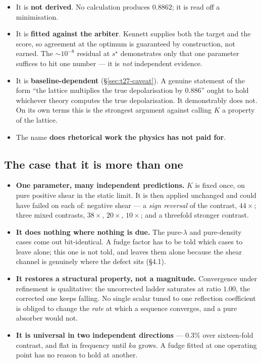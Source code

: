 \documentclass[11pt,a4paper]{article}
\newcommand{\Kren}{K}
\begin{document}
\begin{itemize}[nosep]
  \item It is \textbf{not derived}. No calculation produces $0.8862$; it is read
    off a minimisation.
  \item It is \textbf{fitted against the arbiter}. Kennett supplies both the
    target and the score, so agreement at the optimum is guaranteed by
    construction, not earned. The $\sim\!10^{-8}$ residual at $s^\star$
    demonstrates only that one parameter suffices to hit one number --- it is
    \emph{not} independent evidence.
  \item It is \textbf{baseline-dependent} (\S\ref{sec:t27-caveat}). A genuine
    statement of the form ``the lattice multiplies the true depolarisation by
    $0.886$'' ought to hold whichever theory computes the true depolarisation. It
    demonstrably does not. On its own terms this is the strongest argument
    against calling $\Kren$ a property of the lattice.
  \item The name \textbf{does rhetorical work the physics has not paid for}.
\end{itemize}

\subsection{The case that it is more than one}

\begin{itemize}[nosep]
  \item \textbf{One parameter, many independent predictions.} $\Kren$ is fixed
    once, on pure positive shear in the static limit. It is then applied
    unchanged and could have failed on each of: negative shear --- a
    \emph{sign reversal} of the contrast, $44\times$; three mixed contrasts,
    $38\times$, $20\times$, $10\times$; and a threefold stronger contrast.
  \item \textbf{It does nothing where nothing is due.} The pure-$\lambda$ and
    pure-density cases come out bit-identical. A fudge factor has to be told
    which cases to leave alone; this one is not told, and leaves them alone
    because the shear channel is genuinely where the defect sits (\S4.1).
  \item \textbf{It restores a structural property, not a magnitude.} Convergence
    under refinement is qualitative: the uncorrected ladder saturates at ratio
    $1.00$, the corrected one keeps falling. No single scalar tuned to one
    reflection coefficient is obliged to change the \emph{rate} at which a
    sequence converges, and a pure absorber would not.
  \item \textbf{It is universal in two independent directions} --- $0.3\%$ over
    sixteen-fold contrast, and flat in frequency until $ka$ grows. A fudge
    fitted at one operating point has no reason to hold at another.
\end{itemize}
\end{document}
